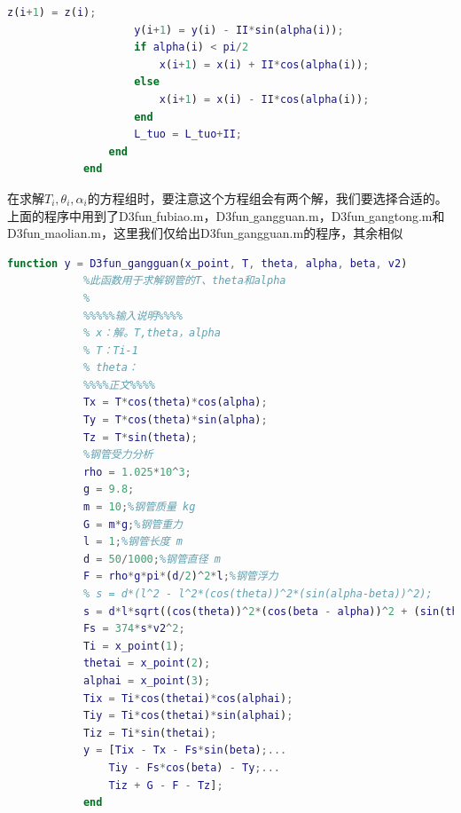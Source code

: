 \documentclass[UTF8]{ctexbook}
\theoremstyle{nonumberplain}
\begin{document}
\begin{lstlisting}[language = Matlab]
                    z(i+1) = z(i);
                    y(i+1) = y(i) - II*sin(alpha(i));
                    if alpha(i) < pi/2
                        x(i+1) = x(i) + II*cos(alpha(i));
                    else
                        x(i+1) = x(i) - II*cos(alpha(i));
                    end
                    L_tuo = L_tuo+II;
                end
            end
            \end{lstlisting}
            \par
            在求解$T_i,\theta_i,\alpha_i$的方程组时，要注意这个方程组会有两个解，我们要选择合适的。上面的程序中用到了D3fun$\_$fubiao.m，D3fun$\_$gangguan.m，D3fun$\_$gangtong.m和D3fun$\_$maolian.m，这里我们仅给出D3fun$\_$gangguan.m的程序，其余相似
            \begin{lstlisting}[language = Matlab]
            function y = D3fun_gangguan(x_point, T, theta, alpha, beta, v2)
            %此函数用于求解钢管的T、theta和alpha
            %
            %%%%%输入说明%%%%
            % x：解。T,theta，alpha
            % T：Ti-1
            % theta：
            %%%%正文%%%%
            Tx = T*cos(theta)*cos(alpha);
            Ty = T*cos(theta)*sin(alpha);
            Tz = T*sin(theta);
            %钢管受力分析
            rho = 1.025*10^3;
            g = 9.8;
            m = 10;%钢管质量 kg
            G = m*g;%钢管重力
            l = 1;%钢管长度 m
            d = 50/1000;%钢管直径 m
            F = rho*g*pi*(d/2)^2*l;%钢管浮力
            % s = d*(l^2 - l^2*(cos(theta))^2*(sin(alpha-beta))^2);
            s = d*l*sqrt((cos(theta))^2*(cos(beta - alpha))^2 + (sin(theta))^2);
            Fs = 374*s*v2^2;
            Ti = x_point(1);
            thetai = x_point(2);
            alphai = x_point(3);
            Tix = Ti*cos(thetai)*cos(alphai);
            Tiy = Ti*cos(thetai)*sin(alphai);
            Tiz = Ti*sin(thetai);
            y = [Tix - Tx - Fs*sin(beta);...
                Tiy - Fs*cos(beta) - Ty;...
                Tiz + G - F - Tz];
            end
            \end{lstlisting}
\end{document}
